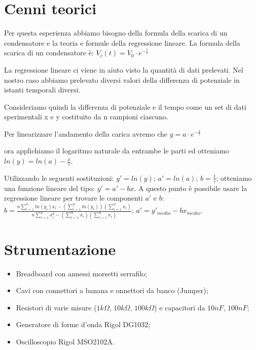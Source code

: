     \section{Cenni teorici}
    Per questa esperienza abbiamo bisogno della formula della scarica di un condensatore e la teoria e formule della regressione lineare.
    La formula della scarica di un condensatore è:
    $V_c(t)=V_0 \cdot e^{-\frac{t}{\tau}}$ \par
    La regressione lineare ci viene in aiuto visto la quantità di dati prelevati.
     Nel nostro caso abbiamo prelevato diversi valori della differenza di potenziale in istanti temporali diversi.\par
    Consideriamo quindi la differenza di potenziale e il tempo come un set di dati sperimentali x e y costituito da n campioni ciascuno.\par 
    Per linearizzare l’andamento della carica avremo che $y=a \cdot e^{-\frac{x}{\tau}}$ \par
    ora applichiamo il logaritmo naturale da entrambe le parti ed otteniamo $ln(y)=ln(a)-{\frac{x}{\tau}}$. \par
    Utilizzando le seguenti sostituzioni: 
    $y'=ln(y)$; 
    $a'=ln(a)$; 
    $b=\frac{1}{\tau}$; 
    otteniamo una funzione lineare del tipo: $y'=a'-bx$.
    A questo punto è possibile usare la regressione lineare per trovare le componenti $a'$ e $b$: 
    $b=\frac{n\sum_{i = 1}^{n} ln(y_i)x_i - (\sum_{i = 1}^{n} ln(y_i))(\sum_{i = 1}^{n} x_i) }{n\sum_{i = 1}^{n} x_i^2 - (\sum_{i = 1}^{n} x_i)(\sum_{i = 1}^{n} x_i)}$; 
    $a'=y'_{medio}-bx_{medio}$. \par


    \section{Strumentazione}
    \begin{itemize}
        \item Breadboard con annessi morsetti serrafilo;
        \item Cavi con connettori a banana e onnettori da banco (Jumper);
        \item Resistori di varie misure ($1k\Omega$, $10k\Omega$, $100k\Omega$) e capacitori da $10nF$, $100nF$;
        \item Generatore di forme d'onda Rigol DG1032;
        \item Oscilloscopio Rigol MSO2102A.
    \end{itemize}

